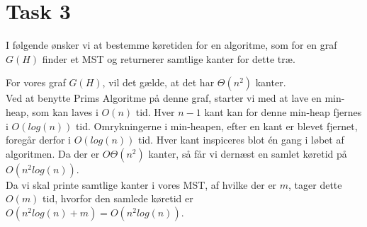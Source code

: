 \section{Task 3}
I følgende ønsker vi at bestemme køretiden for en algoritme, som for en graf $G(H)$ finder et MST og returnerer samtlige kanter for dette træ.
 
For vores graf $G(H)$, vil det gælde, at det har $\Theta(n^2)$ kanter.\\
Ved at benytte Prims Algoritme på denne graf, starter vi med at lave en min-heap, som kan laves i $O(n)$ tid. Hver $n-1$ kant kan for denne min-heap fjernes i $O(log(n))$ tid. Omrykningerne i min-heapen, efter en kant er blevet fjernet, foregår derfor i $O(log(n))$ tid.
Hver kant inspiceres blot én gang i løbet af algoritmen. Da der er $O
\Theta(n^2)$ kanter, så får vi dernæst en samlet køretid på $O(n^2log(n))$.\\
Da vi skal printe samtlige kanter i vores MST, af hvilke der er $m$, tager dette$O(m)$ tid, hvorfor den samlede køretid er $O(n^2log(n) + m) = O(n^2log(n))$.
